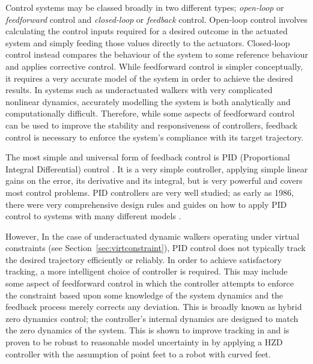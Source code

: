 Control systems may be classed broadly in two different types; \textit{open-loop} or \textit{feedforward} control and \textit{closed-loop} or \textit{feedback} control. Open-loop control involves calculating the control inputs required for a desired outcome in the actuated system and simply feeding those values directly to the actuators. Closed-loop control instead compares the behaviour of the system to some reference behaviour and applies corrective control. While feedforward control is simpler conceptually, it requires a very accurate model of the system in order to achieve the desired results. In systems such as underactuated walkers with very complicated nonlinear dynamics, accurately modelling the system is both analytically and computationally difficult. Therefore, while some aspects of feedforward control can be used to improve the stability and responsiveness of controllers, feedback control is necessary to enforce the system's compliance with its target trajectory.

The most simple and universal form of feedback control is PID (Proportional Integral Differential) control \cite{aastrom2001future}. It is a very simple controller, applying simple linear gains on the error, its derivative and its integral, but is very powerful and covers most control problems. PID controllers are very well studied; as early as 1986, there were very comprehensive design rules and guides on how to apply PID control to systems with many different models \cite{rivera1986internal}. %

However, In the case of underactuated dynamic walkers operating under virtual constraints (see Section~\ref{sec:virtconstraint}), PID control does not typically track the desired trajectory efficiently or reliably. In order to achieve satisfactory tracking, a more intelligent choice of controller is required. This may include some aspect of feedforward control in which the controller attempts to enforce the constraint based upon some knowledge of the system dynamics and the feedback process merely corrects any deviation. This is broadly known as hybrid zero dynamics control; the controller's internal dynamics are designed to match the zero dynamics of the system. This is shown to improve tracking in \cite{sreenath2011compliant} and is proven to be robust to reasonable model uncertainty in \cite{martin2014design} by applying a HZD controller with the assumption of point feet to a robot with curved feet. 

